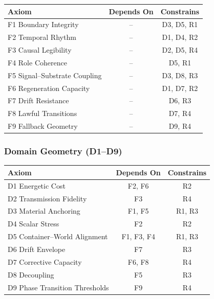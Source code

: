 \begin{center}
\begin{tabular}{lcc}
\toprule
\textbf{Axiom} & \textbf{Depends On} & \textbf{Constrains} \\
\midrule
F1 Boundary Integrity & -- & D3, D5, R1 \\
F2 Temporal Rhythm & -- & D1, D4, R2 \\
F3 Causal Legibility & -- & D2, D5, R4 \\
F4 Role Coherence & -- & D5, R1 \\
F5 Signal–Substrate Coupling & -- & D3, D8, R3 \\
F6 Regeneration Capacity & -- & D1, D7, R2 \\
F7 Drift Resistance & -- & D6, R3 \\
F8 Lawful Transitions & -- & D7, R4 \\
F9 Fallback Geometry & -- & D9, R4 \\
\bottomrule
\end{tabular}
\end{center}

\subsubsection*{Domain Geometry (D1–D9)}

\begin{center}
\begin{tabular}{lcc}
\toprule
\textbf{Axiom} & \textbf{Depends On} & \textbf{Constrains} \\
\midrule
D1 Energetic Cost & F2, F6 & R2 \\
D2 Transmission Fidelity & F3 & R4 \\
D3 Material Anchoring & F1, F5 & R1, R3 \\
D4 Scalar Stress & F2 & R2 \\
D5 Container–World Alignment & F1, F3, F4 & R1, R3 \\
D6 Drift Envelope & F7 & R3 \\
D7 Corrective Capacity & F6, F8 & R4 \\
D8 Decoupling & F5 & R3 \\
D9 Phase Transition Thresholds & F9 & R4 \\
\bottomrule
\end{tabular}
\end{center}

